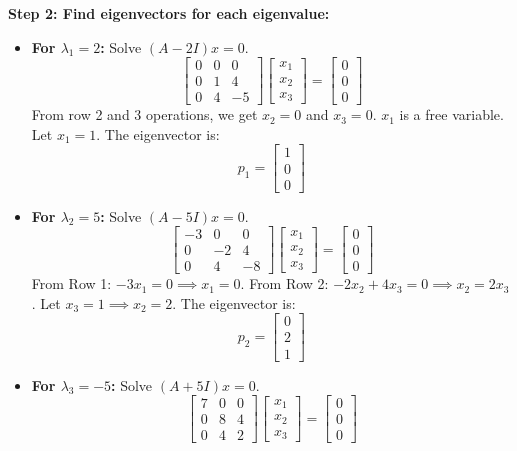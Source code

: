 \documentclass[11pt,a4paper]{article}
\begin{document}
\begin{solutionbox}
\textbf{Step 2: Find eigenvectors for each eigenvalue:}
\begin{itemize}
    \item \textbf{For $\lambda_1 = 2$:} Solve $(A - 2I)x = 0$.
          \[ \begin{bmatrix} 0 & 0 & 0 \\ 0 & 1 & 4 \\ 0 & 4 & -5 \end{bmatrix} \begin{bmatrix} x_1 \\ x_2 \\ x_3 \end{bmatrix} = \begin{bmatrix} 0 \\ 0 \\ 0 \end{bmatrix} \]
          From row 2 and 3 operations, we get $x_2 = 0$ and $x_3 = 0$. $x_1$ is a free variable.
          Let $x_1 = 1$. The eigenvector is:
          \[ p_1 = \begin{bmatrix} 1 \\ 0 \\ 0 \end{bmatrix} \]
    \item \textbf{For $\lambda_2 = 5$:} Solve $(A - 5I)x = 0$.
          \[ \begin{bmatrix} -3 & 0 & 0 \\ 0 & -2 & 4 \\ 0 & 4 & -8 \end{bmatrix} \begin{bmatrix} x_1 \\ x_2 \\ x_3 \end{bmatrix} = \begin{bmatrix} 0 \\ 0 \\ 0 \end{bmatrix} \]
          From Row 1: $-3x_1 = 0 \implies x_1 = 0$.
          From Row 2: $-2x_2 + 4x_3 = 0 \implies x_2 = 2x_3$. Let $x_3 = 1 \implies x_2 = 2$.
          The eigenvector is:
          \[ p_2 = \begin{bmatrix} 0 \\ 2 \\ 1 \end{bmatrix} \]
    \item \textbf{For $\lambda_3 = -5$:} Solve $(A + 5I)x = 0$.
          \[ \begin{bmatrix} 7 & 0 & 0 \\ 0 & 8 & 4 \\ 0 & 4 & 2 \end{bmatrix} \begin{bmatrix} x_1 \\ x_2 \\ x_3 \end{bmatrix} = \begin{bmatrix} 0 \\ 0 \\ 0 \end{bmatrix} \]

\end{itemize}
\end{solutionbox}
\end{document}
